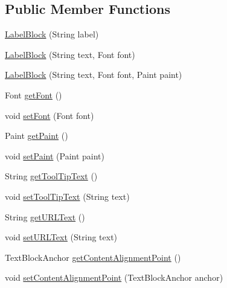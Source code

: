 \subsection*{Public Member Functions}
\begin{DoxyCompactItemize}
\item 
\mbox{\hyperlink{classorg_1_1jfree_1_1chart_1_1block_1_1_label_block_ad170b679bab3a37e9dfdb7423d4fed1a}{Label\+Block}} (String label)
\item 
\mbox{\hyperlink{classorg_1_1jfree_1_1chart_1_1block_1_1_label_block_a1c02f2db2c8ebf06e693b43c447955b5}{Label\+Block}} (String text, Font font)
\item 
\mbox{\hyperlink{classorg_1_1jfree_1_1chart_1_1block_1_1_label_block_a2d90162603bc3ee227900976edefcc4c}{Label\+Block}} (String text, Font font, Paint paint)
\item 
Font \mbox{\hyperlink{classorg_1_1jfree_1_1chart_1_1block_1_1_label_block_acf755b9d091ab69faeca864cf7905874}{get\+Font}} ()
\item 
void \mbox{\hyperlink{classorg_1_1jfree_1_1chart_1_1block_1_1_label_block_ae22755a4ddcc038ac8bcc5f9be873824}{set\+Font}} (Font font)
\item 
Paint \mbox{\hyperlink{classorg_1_1jfree_1_1chart_1_1block_1_1_label_block_abb777abf886b16519d0839e4b78ac8ba}{get\+Paint}} ()
\item 
void \mbox{\hyperlink{classorg_1_1jfree_1_1chart_1_1block_1_1_label_block_a88d7274f6d74fae447e65378468ee28c}{set\+Paint}} (Paint paint)
\item 
String \mbox{\hyperlink{classorg_1_1jfree_1_1chart_1_1block_1_1_label_block_a4a3b1ea9db36840c94af45dbe48a8859}{get\+Tool\+Tip\+Text}} ()
\item 
void \mbox{\hyperlink{classorg_1_1jfree_1_1chart_1_1block_1_1_label_block_a5246d7e339b69d4a5da629b28118e95e}{set\+Tool\+Tip\+Text}} (String text)
\item 
String \mbox{\hyperlink{classorg_1_1jfree_1_1chart_1_1block_1_1_label_block_a79574c2d0dfe0ac5407e20f96abce42b}{get\+U\+R\+L\+Text}} ()
\item 
void \mbox{\hyperlink{classorg_1_1jfree_1_1chart_1_1block_1_1_label_block_a4897e250d1de9464ecdab9ced2b6aa5d}{set\+U\+R\+L\+Text}} (String text)
\item 
Text\+Block\+Anchor \mbox{\hyperlink{classorg_1_1jfree_1_1chart_1_1block_1_1_label_block_a2edc6815317755bd7a62b7c4c0a25b33}{get\+Content\+Alignment\+Point}} ()
\item 
void \mbox{\hyperlink{classorg_1_1jfree_1_1chart_1_1block_1_1_label_block_af5bf205b73126ccbc3f8c30550aa4112}{set\+Content\+Alignment\+Point}} (Text\+Block\+Anchor anchor)

\end{DoxyCompactItemize}
